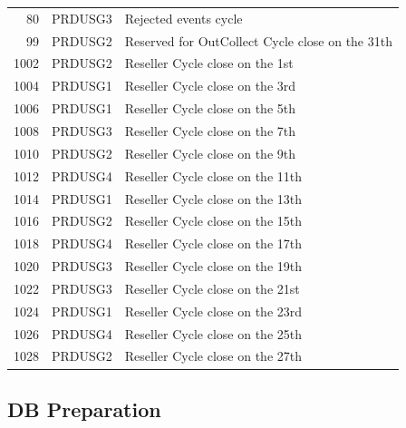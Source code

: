 \documentclass[12pt,twoside]{article}
\begin{document}
\begin{center}
\begin{tabular}{rll}
                 80  &  PRDUSG3            &  Rejected events cycle                            \\
                 99  &  PRDUSG2            &  Reserved for OutCollect Cycle close on the 31th  \\
               1002  &  PRDUSG2            &  Reseller Cycle close on the 1st                  \\
               1004  &  PRDUSG1            &  Reseller Cycle close on the 3rd                  \\
               1006  &  PRDUSG1            &  Reseller Cycle close on the 5th                  \\
               1008  &  PRDUSG3            &  Reseller Cycle close on the 7th                  \\
               1010  &  PRDUSG2            &  Reseller Cycle close on the 9th                  \\
               1012  &  PRDUSG4            &  Reseller Cycle close on the 11th                 \\
               1014  &  PRDUSG1            &  Reseller Cycle close on the 13th                 \\
               1016  &  PRDUSG2            &  Reseller Cycle close on the 15th                 \\
               1018  &  PRDUSG4            &  Reseller Cycle close on the 17th                 \\
               1020  &  PRDUSG3            &  Reseller Cycle close on the 19th                 \\
               1022  &  PRDUSG3            &  Reseller Cycle close on the 21st                 \\
               1024  &  PRDUSG1            &  Reseller Cycle close on the 23rd                 \\
               1026  &  PRDUSG4            &  Reseller Cycle close on the 25th                 \\
               1028  &  PRDUSG2            &  Reseller Cycle close on the 27th                 \\
\hline
\end{tabular}
\end{center}



\normalsize
\subsection{DB Preparation}
\label{sec-8-2}
\end{document}
